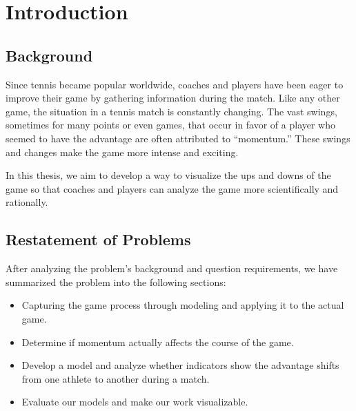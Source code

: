 \newpage
\section{Introduction}
\subsection{Background}
Since tennis became popular worldwide, coaches and players have been eager to improve their game by gathering information during the match. Like any other game, the situation in a tennis match is constantly changing. The vast swings, sometimes for many points or even games, that occur in favor of a player who seemed to have the advantage are often attributed to “momentum.” These swings and changes make the game more intense and exciting.

In this thesis, we aim to develop a way to visualize the ups and downs of the game so that coaches and players can analyze the game more scientifically and rationally.

\subsection{Restatement of Problems}
After analyzing the problem's background and question requirements, we have summarized the problem into the following sections:

\begin{itemize}
    \item Capturing the game process through modeling and applying it to the actual game.
    \item Determine if momentum actually affects the course of the game.
    \item Develop a model and analyze whether indicators show the advantage shifts from one athlete to another during a match.
    \item Evaluate our models and make our work visualizable.
\end{itemize}

